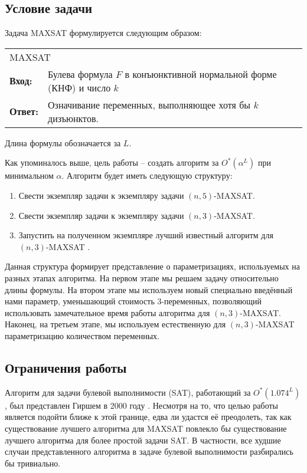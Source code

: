 \subsection*{Условие задачи}

\firstpar{}Задача MAXSAT формулируется следующим образом:

\begin{center}
 \begin{tabular}{|lp{}|}
  \hline
  \multicolumn{2}{|l|}{MAXSAT} \\
  \textbf{Вход:} & Булева формула $F$ в конъюнктивной нормальной форме (КНФ) и число $k$ \\
  \textbf{Ответ:} & Означивание переменных, выполняющее хотя бы $k$ дизъюнктов. \\
  \hline
 \end{tabular}
\end{center}

Длина формулы обозначается за $L$.

Как упоминалось выше, цель работы -- создать алгоритм за $O^*(\alpha^L)$ при минимальном $\alpha$.
Алгоритм будет иметь следующую структуру:

\begin{enumerate}
 \item Свести экземпляр задачи к экземпляру задачи $(n,5)$-MAXSAT.
 
 \item Свести экземпляр задачи к экземпляру задачи $(n,3)$-MAXSAT.

 \item Запустить на полученном экземпляре лучший известный алгоритм для $(n,3)$-MAXSAT \cite{belova18}.
\end{enumerate}

Данная структура формирует представление о параметризациях, используемых на разных этапах алгоритма. На первом этапе мы решаем задачу относительно длины формулы. На втором этапе мы используем новый специально введённый нами параметр, уменьшающий стоимость 3-переменных, позволяющий использовать замечательное время работы алгоритма для $(n,3)$-MAXSAT. Наконец, на третьем этапе, мы используем естественную для $(n,3)$-MAXSAT параметризацию количеством переменных.

\subsection*{Ограничения работы}

\firstpar{}Алгоритм для задачи булевой выполнимости (SAT), работающий за $O^*(1.074^L)$, был представлен Гиршем в 2000 году \cite{hirsch2000new}. Несмотря на то, что целью работы является подойти ближе к этой границе, едва ли удастся её преодолеть, так как существование лучшего алгоритма для MAXSAT повлекло бы существование лучшего алгоритма для более простой задачи SAT. В частности, все худшие случаи представленного алгоритма в задаче булевой выполнимости разбирались бы тривиально.

